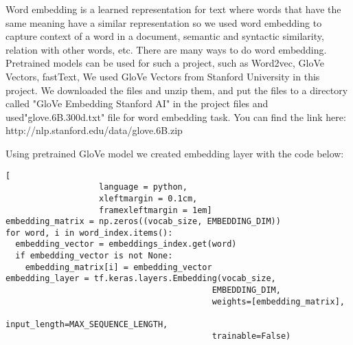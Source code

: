 Word embedding is a learned representation for text where words that have the same meaning have a similar representation so we used word embedding to capture context of a word in a document, semantic and syntactic similarity, relation with other words, etc. There are many ways to do word embedding. Pretrained models can be used for such a project, such as Word2vec, GloVe Vectors, fastText, We used GloVe Vectors from Stanford University in this project. We downloaded the files and unzip them, and put the files to a directory called "GloVe Embedding Stanford AI" in the project files and used"glove.6B.300d.txt" file for word embedding task. You can find the link here: http://nlp.stanford.edu/data/glove.6B.zip

Using pretrained GloVe model we created embedding layer with the code below:

\begin{lstlisting}[
                   language = python,
                   xleftmargin = 0.1cm,
                   framexleftmargin = 1em]
embedding_matrix = np.zeros((vocab_size, EMBEDDING_DIM))
for word, i in word_index.items():
  embedding_vector = embeddings_index.get(word)
  if embedding_vector is not None:
    embedding_matrix[i] = embedding_vector
embedding_layer = tf.keras.layers.Embedding(vocab_size,
                                          EMBEDDING_DIM,
                                          weights=[embedding_matrix],
                                          input_length=MAX_SEQUENCE_LENGTH,
                                          trainable=False)
 \end{lstlisting}
                                         
